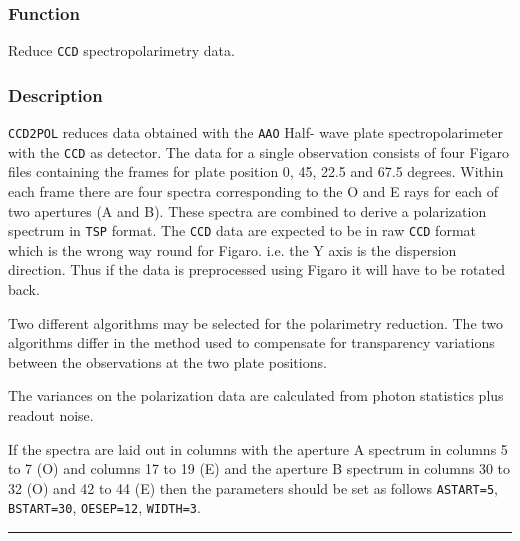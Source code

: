 \documentclass[11pt,twoside,nolof,noabs]{starlink}
\newenvironment{manroutinedescription}{}{\par{}\rule{\textwidth}{0.5mm}}
\newcommand{\manroutineitem}[2]{\subsubsection*{#1}#2\par{}}
\providecommand{\mantt}[1]{\texttt{#1}}
\begin{document}
\begin{manroutinedescription}
\manroutineitem{Function}{}
        Reduce {\mantt{CCD}} spectropolarimetry data.

\manroutineitem{Description}{}
        {\mantt{CCD2POL}} reduces data obtained with the {\mantt{AAO}} Half-%
wave plate
        spectropolarimeter with the {\mantt{CCD}} as detector. The data for a
        single observation consists of four Figaro files containing the
        frames for plate position 0, 45, 22.5 and 67.5 degrees. Within each
        frame there are four spectra corresponding to the O and E rays for
        each of two apertures (A and B). These spectra are combined
        to derive a polarization spectrum in {\mantt{TSP}} format.
        The {\mantt{CCD}} data are expected to be in raw {\mantt{CCD}} format %
which is
        the wrong way round for Figaro. i.e. the Y axis is the dispersion
        direction. Thus if the data is preprocessed using Figaro it will
        have to be rotated back.

        Two different algorithms may be selected for the polarimetry
        reduction. The two algorithms differ in the method used to
        compensate for transparency variations between the observations
        at the two plate positions.

        The variances on the polarization data are calculated from photon
        statistics plus readout noise.

        If the spectra are laid out in columns with the
        aperture A spectrum in columns 5 to 7 (O) and columns 17 to 19 (E)
        and the aperture B spectrum in columns 30 to 32 (O) and 42 to 44 (E)
        then the parameters should be set as follows {\mantt{ASTART=5}}, {%
\mantt{BSTART=30}},
        {\mantt{OESEP=12}}, {\mantt{WIDTH=3}}.



\end{manroutinedescription}
\end{document}
